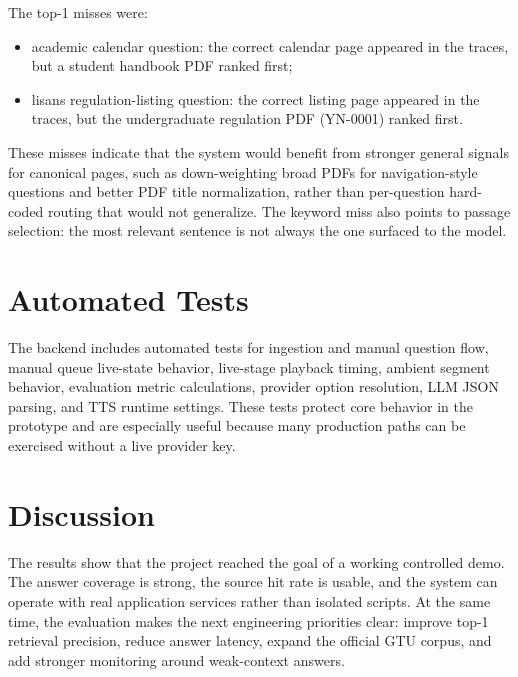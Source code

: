 The top-1 misses were:

\begin{itemize}
    \item academic calendar question: the correct calendar page appeared in the traces, but a student handbook PDF ranked first;
    \item lisans regulation-listing question: the correct listing page appeared in the traces, but the undergraduate regulation PDF (YN-0001) ranked first.
\end{itemize}

These misses indicate that the system would benefit from stronger general signals for canonical pages, such as down-weighting broad PDFs for navigation-style questions and better PDF title normalization, rather than per-question hard-coded routing that would not generalize. The keyword miss also points to passage selection: the most relevant sentence is not always the one surfaced to the model.

\section{Automated Tests}

The backend includes automated tests for ingestion and manual question flow, manual queue live-state behavior, live-stage playback timing, ambient segment behavior, evaluation metric calculations, provider option resolution, LLM JSON parsing, and TTS runtime settings. These tests protect core behavior in the prototype and are especially useful because many production paths can be exercised without a live provider key.

\section{Discussion}

The results show that the project reached the goal of a working controlled demo. The answer coverage is strong, the source hit rate is usable, and the system can operate with real application services rather than isolated scripts. At the same time, the evaluation makes the next engineering priorities clear: improve top-1 retrieval precision, reduce answer latency, expand the official GTU corpus, and add stronger monitoring around weak-context answers.
